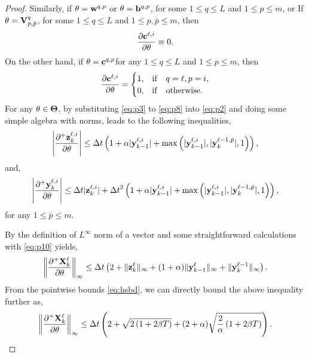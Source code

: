 \documentclass{article}
\newcommand{\by}{{\bf y}}
\newcommand{\bz}{{\bf z}}
\newcommand{\bw}{{\bf w}}
\newcommand{\bb}{{\bf b}}
\newcommand{\bV}{{\bf V}}
\newcommand{\bX}{{\bf X}}
\newcommand{\bc}{{\bf c}}
\newcommand{\Dt}{{\Delta t}}
\begin{document}
\begin{proof}
Similarly, if $\theta = \bw^{q,p}$ or $\theta = \bb^{q,p}$, for some $1\leq q \leq L$ and $1 \leq p \leq m$, or If $\theta = \bV^{q}_{p,\bar{p}}$, for some $1\leq q \leq L$ and $1 \leq p,\bar{p} \leq m$, then
\begin{equation}
    \label{eq:p7}
\frac{\partial \bc^{\ell,i}}{\partial \theta} \equiv 0.
\end{equation}
On the other hand, if $\theta = \bc^{q,p}$for any $1\leq q \leq L$ and $1 \leq p \leq m$, then
\begin{equation}
    \label{eq:p8}
    \frac{\partial \bc^{\ell,i}}{\partial \theta} =\begin{cases} 
    1, &{\rm if}\quad q=\ell, p=i, \\
    0, &{\rm if}\quad {\rm otherwise}.
     \end{cases}
\end{equation}
For any $\theta \in {\bf \Theta}$, by substituting \eqref{eq:p3} to \eqref{eq:p8} into \eqref{eq:p2} and doing some simple algebra with norms, leads to the following inequalities,
\begin{equation}
    \label{eq:p9}
    \left|\frac{\partial^+\bz^{\ell,i}_k}{\partial \theta}\right| \leq \Dt \left (1 + \alpha|\by^{\ell,i}_{k-1}| + \max \left(|\by^{\ell,i}_{k-1}|,|\by^{\ell-1,\bar{p}}_{k}|,1\right)\right),
\end{equation}
and,
\begin{equation}
    \label{eq:p10}
    \left|\frac{\partial^+\by^{\ell,i}_k}{\partial \theta}\right| \leq \Dt|\bz^{\ell,i}_k|+ \Dt^2 \left (1 + \alpha|\by^{\ell,i}_{k-1}| + \max \left(|\by^{\ell,i}_{k-1}|,|\by^{\ell-1,\bar{p}}_{k}|,1\right)\right),
\end{equation}
for any $1 \leq \bar{p} \leq m$.

By the definition of $L^{\infty}$ norm of a vector and some straightforward calculations with \eqref{eq:p10} yields,
\begin{equation}
    \label{eq:p11}
    \left\|\frac{\partial^+\bX^{\ell}_k}{\partial \theta}\right\|_{\infty} \leq \Dt \left(2 + \|\bz^\ell_k\|_{\infty} + (1+\alpha)\|\by^{\ell}_{k-1}\|_{\infty} + \|\by^{\ell-1}_k\|_{\infty}\right).
\end{equation}
From the pointwise bounds \eqref{eq:hsbd}, we can directly bound the above inequality further as,
\begin{equation}
    \label{eq:p12}
    \left\|\frac{\partial^+\bX^{\ell}_k}{\partial \theta}\right\|_{\infty} \leq \Dt \left(2 + \sqrt{2\left(1+2\beta T\right)} + (2+\alpha) \sqrt{\frac{2}{\alpha}\left(1+2\beta T\right)}\right).
\end{equation}


\end{proof}
\end{document}
